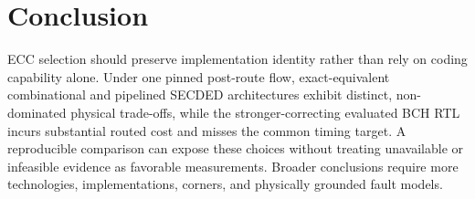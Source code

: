 \section{Conclusion}

ECC selection should preserve implementation identity rather than rely on coding capability alone. Under one pinned post-route flow, exact-equivalent combinational and pipelined SECDED architectures exhibit distinct, non-dominated physical trade-offs, while the stronger-correcting evaluated BCH RTL incurs substantial routed cost and misses the common timing target. A reproducible comparison can expose these choices without treating unavailable or infeasible evidence as favorable measurements. Broader conclusions require more technologies, implementations, corners, and physically grounded fault models.

